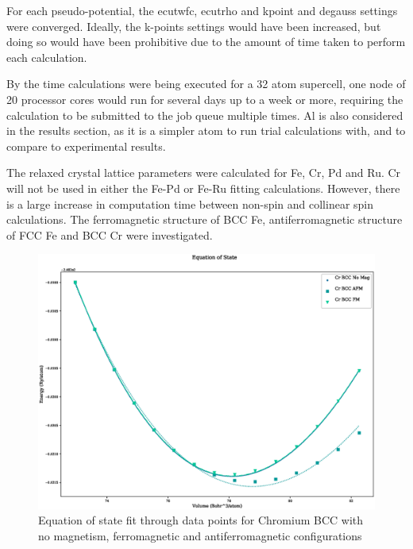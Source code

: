 For each pseudo-potential, the ecutwfc, ecutrho and kpoint and degauss settings were converged.  Ideally, the k-points settings would have been increased, but doing so would have been prohibitive due to the amount of time taken to perform each calculation.

By the time calculations were being executed for a 32 atom supercell, one node of 20 processor cores would run for several days up to a week or more, requiring the calculation to be submitted to the job queue multiple times.  Al is also considered in the results section, as it is a simpler atom to run trial calculations with, and to compare to experimental results.

The relaxed crystal lattice parameters were calculated for Fe, Cr, Pd and Ru.  Cr will not be used in either the Fe-Pd or Fe-Ru fitting calculations.  However, there is a large increase in computation time between non-spin and collinear spin calculations.  The ferromagnetic structure of BCC Fe, antiferromagnetic structure of FCC Fe and BCC Cr were investigated. 

\FloatBarrier
\begin{figure}[h]
\begin{center}
\includegraphics[scale=0.45]{chapters/potentials_fe_pd_ru/qeeos_plots/cr-mag/eos.eps}
\caption{Equation of state fit through data points for Chromium BCC with no magnetism, ferromagnetic and antiferromagnetic configurations}
\label{fig:chromiumeos}
\end{center}
\end{figure}


